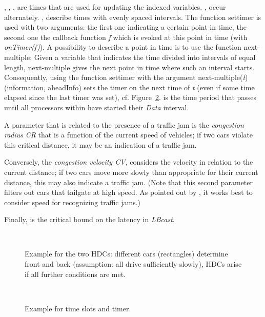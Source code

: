 \documentclass{acmrip}
\begin{document}
, ,
,  are times that
are used for updating the indexed variables. ,
 occur alternately. ,
 describe times with evenly spaced
intervals. The function settimer is used with two arguments: the
first one indicating a certain point in time, the second one the
callback function {\it f} which is evoked at this point in time
(with {\it onTimer(f)}). A possibility to describe a point in time
is to use the function next-multiple: Given a variable that
indicates the time divided into intervals of equal length,
next-multiple gives the next point in time where such an interval
starts. Consequently, using the function settimer with the argument
next-multiple(\textit{t}) (information, aheadInfo)
sets the timer on the next time of \textit{t} (even if some time
elapsed since the last timer was set), cf. Figure~\ref{time}.
 is the time period that passes until all
processors within  have started their {\em Data} interval.

A parameter that is related to the presence of a traffic jam is the
{\em congestion radius} {\em CR} that is a function of the current speed
of vehicles; if two cars violate this critical distance, it may be
an indication of a traffic jam.

Conversely, the {\em congestion velocity CV}, considers the velocity
in relation to the current distance; if two cars move more slowly than
appropriate for their current distance, this may also indicate a
traffic jam. (Note that this second parameter filters out cars that
tailgate at high speed. As pointed out by \cite{brilon05}, it works
best to consider speed for recognizing traffic jams.)

Finally,  is the critical bound on the latency in {\em LBcast}.


\begin{figure}[tp]
\centering
{}\\
\caption{\label{cars}\small Example for the two HDCs: different cars
(rectangles) determine front and back (assumption: all drive sufficiently
slowly), HDCs arise if all further conditions are met. }
\end{figure}












\begin{figure}[tp]
\centering
{}\\
\caption{\label{time}\small Example for time slots and timer. }
\end{figure}
\end{document}

